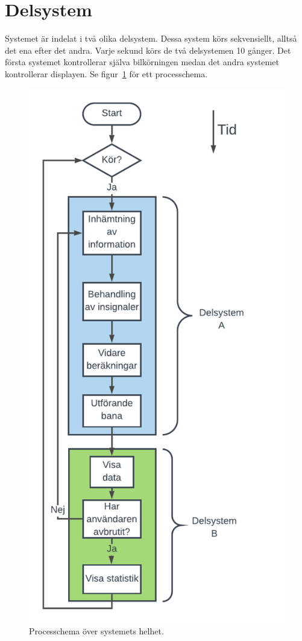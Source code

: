 \section{Delsystem}

Systemet är indelat i två olika delsystem. Dessa system körs
sekvensiellt, alltså det ena efter det andra. Varje sekund körs de två delsystemen 10 gånger. Det första systemet kontrollerar
själva bilkörningen medan det andra systemet kontrollerar displayen. Se
figur~\ref{fig:system_diagram} för ett processchema.

\begin{figure}
  \centering
  \includegraphics[width=\linewidth,height=0.9\textheight,keepaspectratio]{figures/Processchema.pdf}
  \caption{Processchema över systemets helhet.}%
  \label{fig:system_diagram}
\end{figure}

